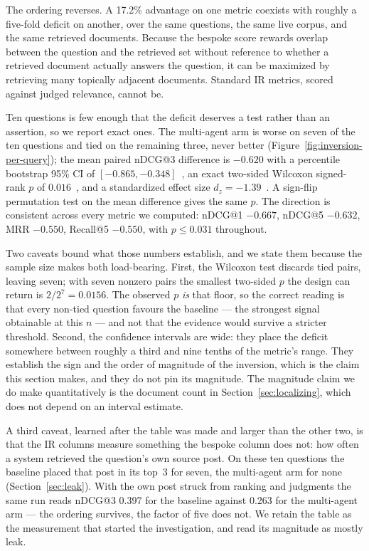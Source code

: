 \documentclass[acmsmall,review,anonymous,screen]{acmart}
\begin{document}
The ordering reverses. A 17.2\% advantage on one metric coexists with roughly a
five-fold deficit on another, over the same questions, the same live corpus, and
the same retrieved documents. Because the bespoke score rewards overlap between
the question and the retrieved set without reference to whether a retrieved
document actually answers the question, it can be maximized by retrieving many
topically adjacent documents. Standard IR metrics, scored against judged
relevance, cannot be.

Ten questions is few enough that the deficit deserves a test rather than an
assertion, so we report exact ones. The multi-agent arm is worse on seven of the
ten questions and tied on the remaining three, never better
(Figure~\ref{fig:inversion-per-query}); the mean paired
nDCG@3 difference is $-0.620$ with a percentile bootstrap 95\% CI of
$[-0.865, -0.348]$~\cite{efron1993bootstrap}, an exact two-sided Wilcoxon
signed-rank $p$ of $0.016$~\cite{wilcoxon1945}, and a standardized effect size
$d_z = -1.39$~\cite{cohen1988power}. A sign-flip permutation test on the
mean difference gives the same $p$. The direction is consistent across every
metric we computed: nDCG@1 $-0.667$, nDCG@5 $-0.632$, MRR $-0.550$, Recall@5
$-0.550$, with $p \le 0.031$ throughout.

Two caveats bound what those numbers establish, and we state them because the
sample size makes both load-bearing. First, the Wilcoxon test discards tied
pairs, leaving seven; with seven nonzero pairs the smallest two-sided $p$ the
design can return is $2/2^{7} = 0.0156$. The observed $p$ \emph{is} that floor,
so the correct reading is that every non-tied question favours the baseline ---
the strongest signal obtainable at this $n$ --- and not that the evidence would
survive a stricter threshold. Second, the confidence intervals are wide: they
place the deficit somewhere between roughly a third and nine tenths of the
metric's range. They establish the sign and the order of magnitude of the
inversion, which is the claim this section makes, and they do not pin its
magnitude. The magnitude claim we do make quantitatively is the document count
in Section~\ref{sec:localizing}, which does not depend on an interval estimate.

A third caveat, learned after the table was made and larger than the other
two, is that the IR columns measure something the bespoke column does not: how
often a system retrieved the question's own source post. On these ten questions
the baseline placed that post in its top~3 for seven, the multi-agent arm for
none (Section~\ref{sec:leak}). With the own post struck from ranking and
judgments the same run reads nDCG@3 0.397 for the baseline against 0.263 for the
multi-agent arm --- the ordering survives, the factor of five does not. We
retain the table as the measurement that started the investigation, and read
its magnitude as mostly leak.
\end{document}
